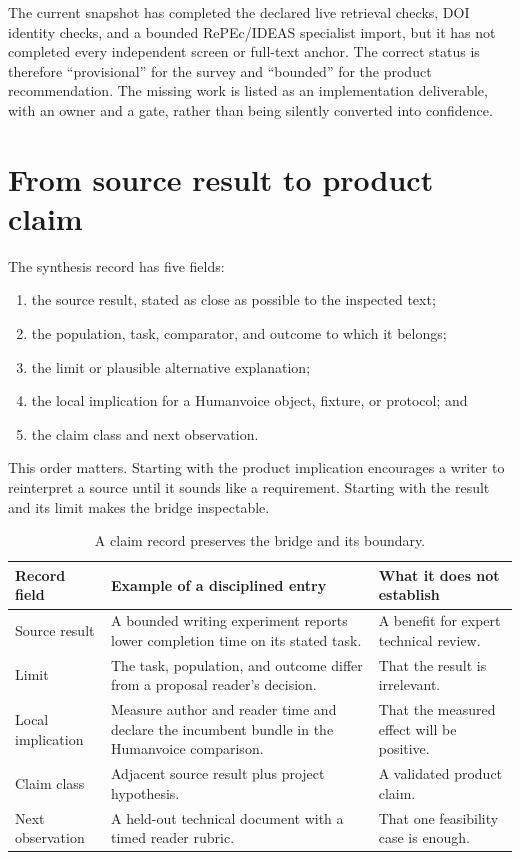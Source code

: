 The current snapshot has completed the declared live retrieval checks, DOI
identity checks, and a bounded RePEc/IDEAS specialist import, but it has not
completed every independent screen or full-text anchor. The correct status is
therefore ``provisional'' for the survey and ``bounded'' for the product
recommendation. The missing work is listed as an implementation deliverable,
with an owner and a gate, rather than being silently converted into
confidence.

\section{From source result to product claim}
\label{sec:method-synthesis}

The synthesis record has five fields:

\begin{enumerate}
\item the source result, stated as close as possible to the inspected text;
\item the population, task, comparator, and outcome to which it belongs;
\item the limit or plausible alternative explanation;
\item the local implication for a Humanvoice object, fixture, or protocol; and
\item the claim class and next observation.
\end{enumerate}

This order matters. Starting with the product implication encourages a writer
to reinterpret a source until it sounds like a requirement. Starting with the
result and its limit makes the bridge inspectable.

\begin{table}[H]
\centering
\small
\begin{tabularx}{\textwidth}{@{}p{}L p{0.25\textwidth}@{}}
\toprule
Record field & Example of a disciplined entry & What it does not establish \\
\midrule
Source result & A bounded writing experiment reports lower completion time on
its stated task. & A benefit for expert technical review. \\
Limit & The task, population, and outcome differ from a proposal reader's
decision. & That the result is irrelevant. \\
Local implication & Measure author and reader time and declare the incumbent
bundle in the Humanvoice comparison. & That the measured effect will be
positive. \\
Claim class & Adjacent source result plus project hypothesis. & A validated
product claim. \\
Next observation & A held-out technical document with a timed reader rubric. &
That one feasibility case is enough. \\
\bottomrule
\end{tabularx}
\caption{A claim record preserves the bridge and its boundary.}
\label{tab:method-claim-record}
\end{table}

